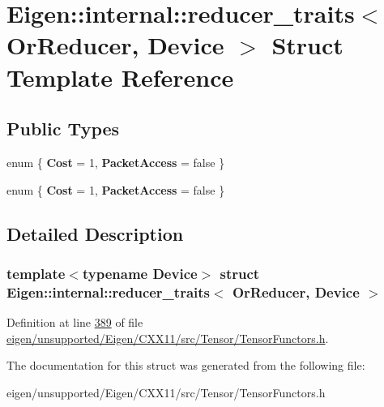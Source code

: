 \hypertarget{struct_eigen_1_1internal_1_1reducer__traits_3_01_or_reducer_00_01_device_01_4}{}\section{Eigen\+:\+:internal\+:\+:reducer\+\_\+traits$<$ Or\+Reducer, Device $>$ Struct Template Reference}
\label{struct_eigen_1_1internal_1_1reducer__traits_3_01_or_reducer_00_01_device_01_4}
\subsection*{Public Types}
\begin{DoxyCompactItemize}
\item 
\mbox{\label{struct_eigen_1_1internal_1_1reducer__traits_3_01_or_reducer_00_01_device_01_4_a3dd53c3264f35c983c235f3706029f0d}} 
enum \{ {\bfseries Cost} = 1, 
{\bfseries Packet\+Access} = false
 \}
\item 
\mbox{\label{struct_eigen_1_1internal_1_1reducer__traits_3_01_or_reducer_00_01_device_01_4_ac669aff68f084b354f98c3cb90a5db78}} 
enum \{ {\bfseries Cost} = 1, 
{\bfseries Packet\+Access} = false
 \}
\end{DoxyCompactItemize}


\subsection{Detailed Description}
\subsubsection*{template$<$typename Device$>$\newline
struct Eigen\+::internal\+::reducer\+\_\+traits$<$ Or\+Reducer, Device $>$}



Definition at line \hyperlink{eigen_2unsupported_2_eigen_2_c_x_x11_2src_2_tensor_2_tensor_functors_8h_source_l00389}{389} of file \hyperlink{eigen_2unsupported_2_eigen_2_c_x_x11_2src_2_tensor_2_tensor_functors_8h_source}{eigen/unsupported/\+Eigen/\+C\+X\+X11/src/\+Tensor/\+Tensor\+Functors.\+h}.



The documentation for this struct was generated from the following file\+:\begin{DoxyCompactItemize}
\item 
eigen/unsupported/\+Eigen/\+C\+X\+X11/src/\+Tensor/\+Tensor\+Functors.\+h\end{DoxyCompactItemize}
